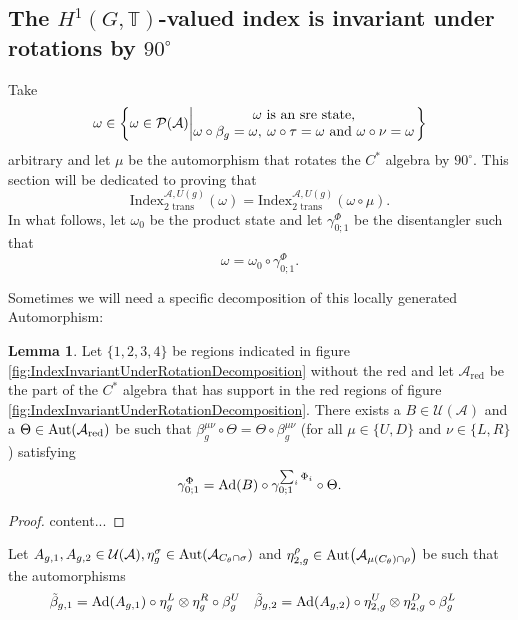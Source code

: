 \documentclass[12pt,a4paper,twoside]{article}
\let\originalleft\left
\let\originalright\right
\renewcommand{\left}{\mathopen{}\mathclose\bgroup\originalleft}
\renewcommand{\right}{\aftergroup\egroup\originalright}
\newcommand{\UU}{\mathcal U}
\newcommand{\PP}{\mathcal P}
\newcommand{\TT}{\mathbb T}
\renewcommand{\AA}{\mathcal A}
\newcommand{\Ad}[1]{\textrm{Ad}\left(#1\right)}
\newcommand{\Aut}[1]{\textrm{Aut}\left(#1\right)}
\theoremstyle{definition}
\newtheorem{lemma}[theorem]{Lemma}
\numberwithin{equation}{section}
\begin{document}
\subsection{The $H^1(G,\TT)$-valued index is invariant under rotations by $90^\circ$}
Take
\begin{equation}
	\omega\in\left\{\omega\in\PP(\AA)\left| \begin{matrix}\omega\text{ is an sre state,}\\\omega\circ\beta_g=\omega,\:\omega\circ\tau=\omega\text{ and }\omega\circ\nu=\omega\end{matrix} \right.\right\}
\end{equation}
arbitrary and let $\mu$ be the automorphism that rotates the $C^*$ algebra by $90^\circ$. This section will be dedicated to proving that
\begin{equation}
	\textrm{Index}_{\text{2 trans}}^{\AA,U(g)}(\omega)=\textrm{Index}_{\text{2 trans}}^{\AA,U(g)}(\omega\circ\mu).
\end{equation}
In what follows, let $\omega_0$ be the product state and let $\gamma^\Phi_{0;1}$ be the disentangler such that
\begin{equation}
	\omega=\omega_0\circ\gamma^\Phi_{0;1}.
\end{equation}

Sometimes we will need a specific decomposition of this locally generated Automorphism:
\begin{lemma}\label{lem:DecompositionOfLGAInCross}
	Let $\{1,2,3,4\}$ be regions indicated in figure \ref{fig:IndexInvariantUnderRotationDecomposition} without the red and let $\AA_{\text{red}}$ be the part of the $C^*$ algebra that has support in the red regions of figure \ref{fig:IndexInvariantUnderRotationDecomposition}. There exists a $B\in\UU(\AA)$ and a $\Theta\in\Aut{\AA_{\text{red}}}$ be such that $\beta^{\mu\nu}_g\circ\Theta=\Theta\circ\beta^{\mu\nu}_g$ (for all $\mu\in\{U,D\}$ and $\nu\in\{L,R\}$) satisfying
	\begin{equation}
		\gamma^\Phi_{0;1}=\Ad{B}\circ\gamma^{\sum_i\Phi_i}_{0;1}\circ\Theta.
	\end{equation}
\end{lemma}
\begin{proof}
	content...
\end{proof}
Let $A_{g,1},A_{g,2}\in\UU(\AA),\eta^\sigma_g\in\Aut{\AA_{C_\theta\cap\sigma}}$ and $\eta^\rho_{2,g}\in\Aut{\AA_{\mu(C_\theta)\cap\rho}}$ be such that the automorphisms
\begin{align}
	\tilde{\beta}_{g,1}&=\Ad{A_{g,1}}\circ\eta_g^L\otimes\eta_g^R\circ\beta_g^U&\tilde{\beta}_{g,2}&=\Ad{A_{g,2}}\circ\eta_{2,g}^U\otimes\eta_{2,g}^D\circ\beta_g^L
\end{align}
\end{document}
